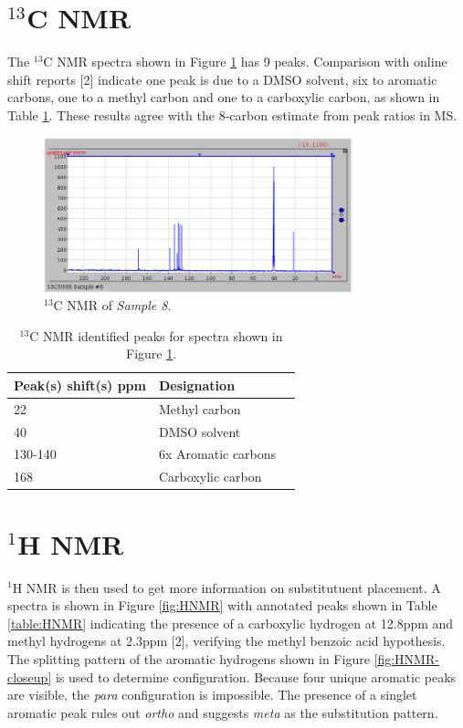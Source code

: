 \documentclass[8.5pt,twoside,twocolumn]{article}
\begin{document}
\section{$^{13}$C NMR}
The $^{13}$C NMR spectra shown in Figure \ref{fig:CNMR} has 9 peaks. Comparison with online shift reports [2] indicate one peak is due to a DMSO solvent, six to aromatic carbons, one to a methyl carbon and one to a carboxylic carbon, as shown in Table \ref{table:MS}. These results agree with the 8-carbon estimate from peak ratios in MS.\\

\begin{figure}[h]
\centering
  \includegraphics[height=4.5cm]{figures/CNMR.png}
  \caption{$^{13}$C NMR of \textit{Sample 8}.}
  \label{fig:CNMR}
\end{figure}

\begin{table}[h]
\small
  \caption{$^{13}$C NMR identified peaks for spectra shown in Figure \ref{fig:CNMR}.}
  \label{table:MS}
  \begin{tabular*}{0.5\textwidth}{@{\extracolsep{\fill}}lll}
    \hline
    Peak(s) shift(s) ppm & Designation \\
    \hline
    22 & Methyl carbon \\
    40 & DMSO solvent\\
    130-140 & 6x Aromatic carbons\\
    168 & Carboxylic carbon\\
    \hline
  \end{tabular*}
\end{table}

\section{$^{1}$H NMR}
$^{1}$H NMR is then used to get more information on substitutuent placement. A spectra is shown in Figure \ref{fig:HNMR} with annotated peaks shown in Table \ref{table:HNMR} indicating the presence of a carboxylic hydrogen at 12.8ppm and methyl hydrogens at 2.3ppm [2], verifying the methyl benzoic acid hypothesis. The splitting pattern of the aromatic hydrogens shown in Figure \ref{fig:HNMR-closeup} is used to determine configuration. Because four unique aromatic peaks are visible, the \textit{para} configuration is impossible. The presence of a singlet aromatic peak rules out \textit{ortho} and suggests \textit{meta} as the substitution pattern.\\
\end{document}
